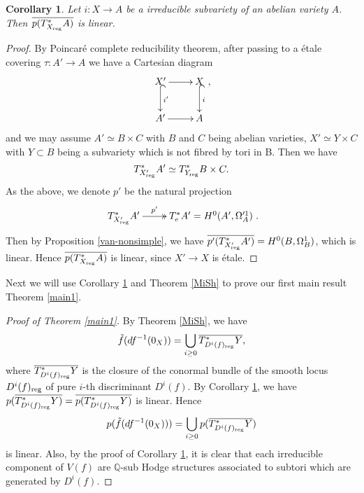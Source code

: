 \documentclass[a4paper,12pt,reqno]{amsart}
\theoremstyle{plain}
\newtheorem{corollary}[theorem]{Corollary}
\theoremstyle{definition}
\theoremstyle{remark}
\newcommand{\Q}{\mathbb Q}
\renewcommand{\cong}{\simeq}
\begin{document}
\begin{corollary}\label{Main-coro}
Let $i: X\to A$ be a irreducible subvariety of an abelian variety $A$. Then $\overline{p(T^*_{X_{\textnormal{reg}}}A)}$ is linear. 
\end{corollary}


\begin{proof}
By Poincar\'e complete reducibility theorem, after passing to a \'etale covering $\tau:A'\to A$ we have a Cartesian diagram 
$$\xymatrix{
X'\ar[r]\ar@{^{(}->}[d]^-{i'}& X\ar@{^{(}->}[d]^-{i}\\
A'\ar[r]& A},$$ and we may assume $A'\cong B\times C$ with $B$ and $C$ being abelian varieties, $X'\cong Y\times C$ with $Y\subset B$ being a subvariety which is not fibred by tori in B. Then we have $$T^*_{X'_{\textnormal{reg}}}A'\cong T^*_{Y_{\textnormal{reg}}}B\times C.$$ As the above, we denote $p'$ be the natural projection $$\xymatrix{
T^*_{X'_{\textnormal{reg}}}A'\ar@{->>}[r]^-{p'}& T^*_e A'=H^0(A', \Omega_A'^1)
}.$$  Then by Proposition \ref{van-nonsimple}, we have $\overline{p'(T^*_{X'_{\textnormal{reg}}}A')}=H^0(B, \Omega_B^1)$, which is linear. Hence $\overline{p(T^*_{X_{\textnormal{reg}}}A)}$ is linear, since $X'\to X$ is \'etale.
\end{proof}

Next we will use Corollary \ref{Main-coro} and Theorem \ref{MiSh} to prove our first main result Theorem \ref{main1}.

\begin{proof}[Proof of Theorem \ref{main1}]
By Theorem \ref{MiSh}, we have $$\tilde{f}(df^{-1}(0_X))=\bigcup_{i\geq0}\overline{T^*_{D^i(f)_{\textnormal{reg}}}Y},$$ where $\overline{T^*_{D^i(f)_{\textnormal{reg}}}Y}$ is the closure of the conormal bundle of the smooth locus $D^i(f)_{\textnormal{reg}}$ of pure $i$-th discriminant $D^i(f)$. By Corollary \ref{Main-coro}, we have $p(\overline{T^*_{D^i(f)_{\textnormal{reg}}}Y)}=\overline{p(T^*_{D^i(f)_{\textnormal{reg}}}Y)}$ is linear. Hence $$p(\tilde{f}(df^{-1}(0_X)))=\bigcup_{i\geq0}p(\overline{T^*_{D^i(f)_{\textnormal{reg}}}Y})$$ is linear. Also, by the proof of Corollary \ref{Main-coro}, it is clear that each irreducible component of $V(f)$ are $\Q$-sub Hodge structures associated to subtori which are generated by $D^i(f)$.
\end{proof}
\end{document}
